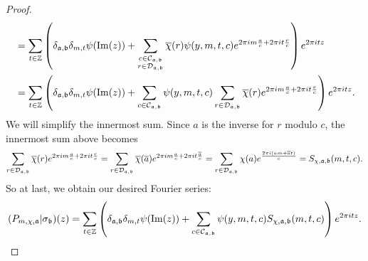 \documentclass[12pt,oneside]{book}
\begin{document}
\begin{proof}
\begin{align*}
        &= \sum_{t \in \mathbb{Z}}\left(\delta_{\mathfrak{a},\mathfrak{b}}\delta_{m,t}\psi(\mathrm{Im}(z))+\sum_{\substack{c \in \mathcal{C}_{\mathfrak{a},\mathfrak{b}} \\ r \in \mathcal{D}_{\mathfrak{a},\mathfrak{b}}}}\overline{\chi}(r)\psi(y,m,t,c)e^{2\pi im\frac{a}{c}+2\pi it\frac{r}{c}}\right)e^{2\pi itz} \\
        &= \sum_{t \in \mathbb{Z}}\left(\delta_{\mathfrak{a},\mathfrak{b}}\delta_{m,t}\psi(\mathrm{Im}(z))+\sum_{\substack{c \in \mathcal{C}_{\mathfrak{a},\mathfrak{b}}}}\psi(y,m,t,c)\sum_{r \in \mathcal{D}_{\mathfrak{a},\mathfrak{b}}}\overline{\chi}(r)e^{2\pi im\frac{a}{c}+2\pi it\frac{r}{c}}\right)e^{2\pi itz}.
      \end{align*}
      We will simplify the innermost sum. Since $a$ is the inverse for $r$ modulo $c$, the innermost sum above becomes
      \[
        \sum_{r \in \mathcal{D}_{\mathfrak{a},\mathfrak{b}}}\overline{\chi}(r)e^{2\pi im\frac{a}{c}+2\pi it\frac{r}{c}} = \sum_{r \in \mathcal{D}_{\mathfrak{a},\mathfrak{b}}}\overline{\chi}(\overline{a})e^{2\pi im\frac{a}{c}+2\pi it\frac{\overline{a}}{c}} = \sum_{r \in \mathcal{D}_{\mathfrak{a},\mathfrak{b}}}\chi(a)e^{\frac{2\pi i(am+\overline{a}t)}{c}} = S_{\chi,\mathfrak{a},\mathfrak{b}}(m,t,c).
      \]
      So at last, we obtain our desired Fourier series:
      \[
        (P_{m,\chi,\mathfrak{a}}|\sigma_{\mathfrak{b}})(z) = \sum_{t \in \mathbb{Z}}\left(\delta_{\mathfrak{a},\mathfrak{b}}\delta_{m,t}\psi(\mathrm{Im}(z))+\sum_{\substack{c \in \mathcal{C}_{\mathfrak{a},\mathfrak{b}}}}\psi(y,m,t,c)S_{\chi,\mathfrak{a},\mathfrak{b}}(m,t,c)\right)e^{2\pi itz}.
      \]
    \end{proof}
\end{document}
